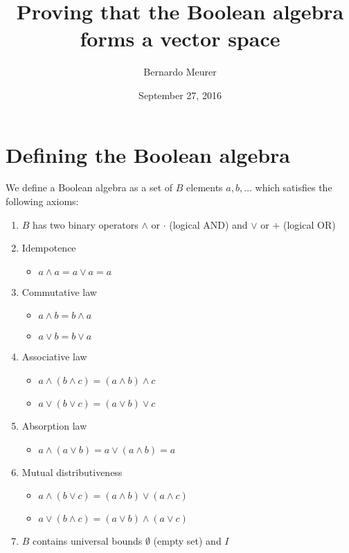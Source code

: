 \documentclass{article}
\title{Proving that the Boolean algebra forms a vector space}
\date{September 27, 2016}
\author{Bernardo Meurer}
\begin{document}
\maketitle
\newpage
\section{Defining the Boolean algebra}
\label{sec:Defining the Boolean algebra}

We define a Boolean algebra as a set of $B$ elements $a,b,\dots$ which satisfies
the following axioms\cite{booleanalgebra}:

\begin{enumerate}
	\item $B$ has two binary operators $\wedge$ or $\cdot$ (logical AND) and
	      $\vee$ or $+$ (logical OR)
	\item Idempotence
	      \begin{itemize}
	      	\item $a\wedge a = a \vee a = a$
	      \end{itemize}
	\item Commutative law
	      \begin{itemize}
	      	\item $a \wedge b = b \wedge a$
	      	\item $a \vee b = b \vee a$
	      \end{itemize}
	\item Associative law
	      \begin{itemize}
	      	\item $a \wedge (b \wedge c) = (a \wedge b) \wedge c$
	      	\item $a \vee (b \vee c) = (a \vee b) \vee c$
	      \end{itemize}
	\item Absorption law
	      \begin{itemize}
	      	\item $a \wedge (a \vee b) = a \vee (a \wedge b) = a$
	      \end{itemize}
	\item Mutual distributiveness
	      \begin{itemize}
	      	\item $a \wedge (b \vee c) = (a \wedge b) \vee (a \wedge c)$
	      	\item $a \vee (b \wedge c) = (a \vee b) \wedge (a \vee c)$
	      \end{itemize}
	\item $B$ contains universal bounds $\emptyset$ (empty set) and $I$

\end{enumerate}
\end{document}

